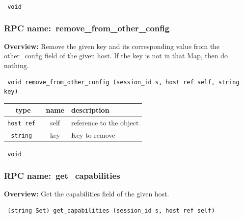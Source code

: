 \vspace{0.3cm}

{\tt 
void
}



\vspace{0.3cm}
\vspace{0.3cm}
\vspace{0.3cm}
\subsubsection{RPC name:~remove\_from\_other\_config}

{\bf Overview:} 
Remove the given key and its corresponding value from the other\_config
field of the given host.  If the key is not in that Map, then do nothing.

\begin{verbatim} void remove_from_other_config (session_id s, host ref self, string key)\end{verbatim}



 
\vspace{0.3cm}
\begin{tabular}{|c|c|p{7cm}|}
 \hline
{\bf type} & {\bf name} & {\bf description} \\ \hline
{\tt host ref } & self & reference to the object \\ \hline 

{\tt string } & key & Key to remove \\ \hline 

\end{tabular}

\vspace{0.3cm}

{\tt 
void
}



\vspace{0.3cm}
\vspace{0.3cm}
\vspace{0.3cm}
\subsubsection{RPC name:~get\_capabilities}

{\bf Overview:} 
Get the capabilities field of the given host.

\begin{verbatim} (string Set) get_capabilities (session_id s, host ref self)\end{verbatim}


